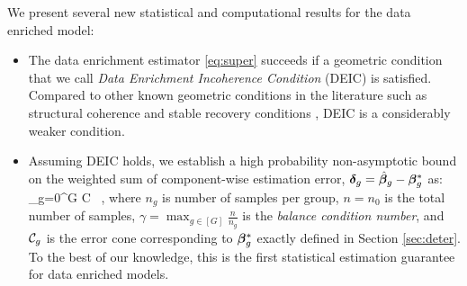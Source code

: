 We present several new statistical and computational results for the data enriched model:
\begin{itemize}[leftmargin = .4cm]
	\item The data enrichment estimator \eqref{eq:super} succeeds if a geometric condition that we call \emph{Data Enrichment Incoherence Condition} (DEIC) is satisfied. Compared to other known geometric conditions in the literature such as structural coherence \cite{guba16} and stable recovery conditions \cite{mctr13}, DEIC is a considerably weaker condition.
	\item Assuming DEIC holds, we establish a high probability non-asymptotic bound on the weighted sum of component-wise estimation error, $\boldsymbol{\delta}_g = \hat{\boldsymbol{\beta}}_g - \boldsymbol{\beta}_g^*$ as:
	\be
	\label{eq:errorsum}
	\sum_{g=0}^{G}    \leq  C \gamma {}~,
	\ee
	where $n_g$ is number of samples per group, $n = n_0$ is the total number of samples, $\gamma = \max_{g \in [G] } \frac{n}{n_g}$ is the \emph{balance condition number}, and ${\cal C}_g$ is the error cone corresponding to $\boldsymbol{\beta}_g^*$ exactly defined in Section \ref{sec:deter}.
	To the best of our knowledge, this is the first statistical estimation guarantee for data enriched models.
	

\end{itemize}
